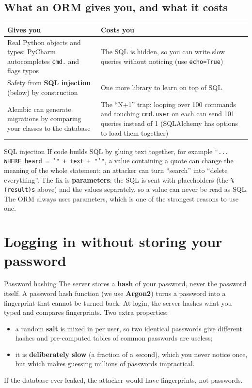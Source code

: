 \documentclass[11pt,a4paper]{article}
\begin{document}
\subsection{What an ORM gives you, and what it costs}
\begin{center}
\renewcommand{\arraystretch}{1.2}
\begin{tabularx}{\textwidth}{X X}
\toprule
\textbf{Gives you} & \textbf{Costs you} \\
\midrule
Real Python objects and types; PyCharm autocompletes \texttt{cmd.} and flags typos &
The SQL is hidden, so you can write slow queries without noticing (use \texttt{echo=True}) \\
Safety from \textbf{SQL injection} (below) by construction &
One more library to learn on top of SQL \\
Alembic can generate migrations by comparing your classes to the database &
The ``N+1'' trap: looping over 100 commands and touching \texttt{cmd.user} on each can send 101
queries instead of 1 (SQLAlchemy has options to load them together) \\
\bottomrule
\end{tabularx}
\end{center}

\begin{concept}{SQL injection}
If code builds SQL by gluing text together, for example
\texttt{"... WHERE heard = '" + text + "'"}, a value containing a quote can change the meaning of
the whole statement; an attacker can turn ``search'' into ``delete everything''. The fix is
\textbf{parameters}: the SQL is sent with placeholders (the \texttt{\%(result)s} above) and the
values separately, so a value can never be read as SQL. The ORM always uses parameters, which is
one of the strongest reasons to use one.
\end{concept}

\section{Logging in without storing your password}\label{sec:auth}

\begin{concept}{Password hashing}
The server stores a \textbf{hash} of your password, never the password itself. A password hash
function (we use \textbf{Argon2}) turns a password into a fingerprint that cannot be turned back.
At login, the server hashes what you typed and compares fingerprints. Two extra properties:
\begin{itemize}[nosep]
  \item a random \textbf{salt} is mixed in per user, so two identical passwords give different
        hashes and pre-computed tables of common passwords are useless;
  \item it is \textbf{deliberately slow} (a fraction of a second), which you never notice once,
        but which makes guessing millions of passwords impractical.
\end{itemize}
If the database ever leaked, the attacker would have fingerprints, not passwords.
\end{concept}
\end{document}
